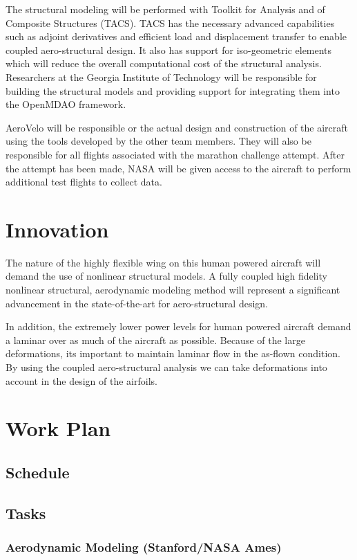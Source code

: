 \documentclass[]{report}
\begin{document}
    The structural modeling will be performed with Toolkit for Analysis and of Composite 
    Structures (TACS). TACS has the necessary advanced capabilities such as adjoint derivatives 
    and efficient load and displacement transfer to enable coupled aero­-structural design. It also has 
    support for iso-geometric elements which will reduce the overall computational cost of the 
    structural analysis. Researchers at the Georgia Institute of Technology will be responsible for 
    building the structural models and providing support for integrating them into the OpenMDAO framework. 

    AeroVelo will be responsible or the actual design and construction of the aircraft using the tools developed 
    by the other team members. They will also be responsible for all flights associated with 
    the marathon challenge attempt. After the attempt has been made, NASA will be given access to 
    the aircraft to perform additional test flights to collect data. 


  \section{Innovation}
    The nature of the highly flexible wing on this human powered aircraft will demand the use 
    of nonlinear structural models. A fully coupled high fidelity nonlinear structural, aerodynamic modeling method 
    will represent a significant advancement in the state­-of-­the-­art for aero­-structural design. 

    In addition, the extremely lower power levels for human powered aircraft demand a laminar over as much of 
    the aircraft as possible. Because of the large deformations, its important to maintain laminar flow in the 
    as-flown condition. By using the coupled aero-structural analysis we can take deformations into account in the design 
    of the airfoils. 

  \section{Work Plan}
    \subsection{Schedule}
    \subsection{Tasks}
        \subsubsection{Aerodynamic Modeling (Stanford/NASA Ames)}
\end{document}
